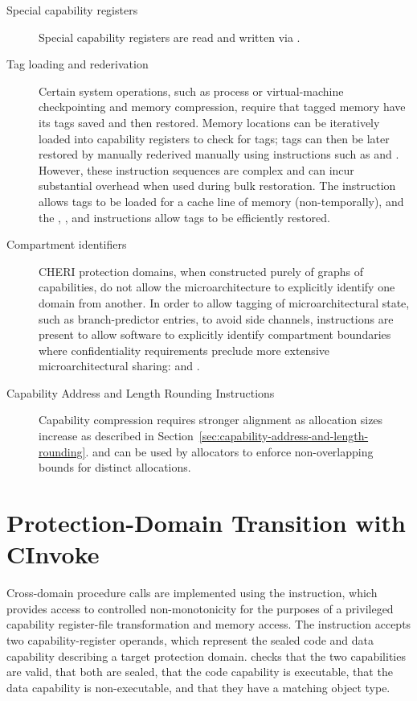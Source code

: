 \begin{description}
\item[Special capability registers]
Special capability registers are read and written via .

\item[Tag loading and rederivation]
Certain system operations, such as process or virtual-machine checkpointing
and memory compression, require that tagged memory have its tags saved and
then restored.
Memory locations can be iteratively loaded into capability registers to check
for tags; tags can then be later restored by manually rederived manually using
instructions such as  and .
However, these instruction sequences are complex and can incur substantial
overhead when used during bulk restoration.
The  instruction allows tags to be loaded for a cache
line of memory (non-temporally), and the ,
, and  instructions allow tags to
be efficiently restored.

\item[Compartment identifiers]
CHERI protection domains, when constructed purely of graphs of capabilities,
do not allow the microarchitecture to explicitly identify one domain from
another.
In order to allow tagging of microarchitectural state, such as
branch-predictor entries, to avoid side channels, instructions are present to
allow software to explicitly identify compartment boundaries where
confidentiality requirements preclude more extensive microarchitectural
sharing:  and .

\item[Capability Address and Length Rounding Instructions]
Capability compression requires stronger alignment as allocation
sizes increase  as described in
Section~\ref{sec:capability-address-and-length-rounding}.
 and  can be used by allocators to enforce
non-overlapping bounds for distinct allocations.
\end{description}

\section{Protection-Domain Transition with CInvoke}
\label{section:protection-domain-transition-with-cinvoke}

Cross-domain procedure calls are implemented using the 
instruction, which provides access to controlled non-monotonicity for the
purposes of a privileged capability register-file transformation and memory
access.
The instruction accepts two capability-register operands, which represent the
sealed code and data capability describing a target protection domain.
 checks that the two capabilities are valid, that both are
sealed, that the code capability is executable, that the data capability is
non-executable, and that they have a matching object type.

